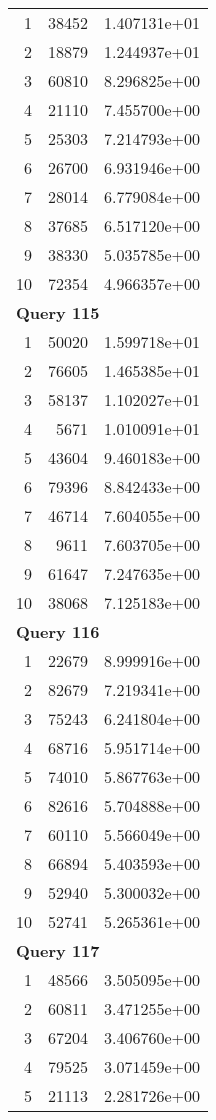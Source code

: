 \begin{longtable}[{p}]{@{}rrp{}@{}}
1 & 38452 & 1.407131e+01 \\
2 & 18879 & 1.244937e+01 \\
3 & 60810 & 8.296825e+00 \\
4 & 21110 & 7.455700e+00 \\
5 & 25303 & 7.214793e+00 \\
6 & 26700 & 6.931946e+00 \\
7 & 28014 & 6.779084e+00 \\
8 & 37685 & 6.517120e+00 \\
9 & 38330 & 5.035785e+00 \\
10 & 72354 & 4.966357e+00 \\
\midrule
\multicolumn{3}{l}{\bfseries Query 115} \\
1 & 50020 & 1.599718e+01 \\
2 & 76605 & 1.465385e+01 \\
3 & 58137 & 1.102027e+01 \\
4 & 5671 & 1.010091e+01 \\
5 & 43604 & 9.460183e+00 \\
6 & 79396 & 8.842433e+00 \\
7 & 46714 & 7.604055e+00 \\
8 & 9611 & 7.603705e+00 \\
9 & 61647 & 7.247635e+00 \\
10 & 38068 & 7.125183e+00 \\
\midrule
\multicolumn{3}{l}{\bfseries Query 116} \\
1 & 22679 & 8.999916e+00 \\
2 & 82679 & 7.219341e+00 \\
3 & 75243 & 6.241804e+00 \\
4 & 68716 & 5.951714e+00 \\
5 & 74010 & 5.867763e+00 \\
6 & 82616 & 5.704888e+00 \\
7 & 60110 & 5.566049e+00 \\
8 & 66894 & 5.403593e+00 \\
9 & 52940 & 5.300032e+00 \\
10 & 52741 & 5.265361e+00 \\
\midrule
\multicolumn{3}{l}{\bfseries Query 117} \\
1 & 48566 & 3.505095e+00 \\
2 & 60811 & 3.471255e+00 \\
3 & 67204 & 3.406760e+00 \\
4 & 79525 & 3.071459e+00 \\
5 & 21113 & 2.281726e+00 \\

\end{longtable}

